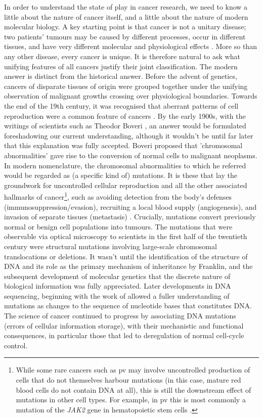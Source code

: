 \documentclass[../thesis.tex]{subfiles}
\begin{document}
In order to understand the state of play in cancer research, we need to know a little about the nature of cancer itself, and a little about the nature of modern molecular biology. A key starting point is that cancer is not a unitary disease;  two patients’ tumours may be caused by different processes, occur in different tissues, and have very different molecular and physiological effects \citep{wittekind_tnm_2016}. More so than any other disease, every cancer is unique. It is therefore natural to ask what unifying features of all cancers justify their joint classification. The modern answer is distinct from the historical answer. Before the advent of genetics, cancers of disparate tissues of origin were grouped together under the unifying observation of malignant growths crossing over physiological boundaries. Towards the end of the 19th century, it was recognised that aberrant patterns of cell reproduction were a common feature of cancers \citep{weinstein_history_2008}. By the early 1900s, with the writings of scientists such as Theodor Boveri \citep[see][for a modern translation]{boveri_concerning_2008}, an answer would be formulated foreshadowing our current understanding, although it wouldn't be until far later that this explanation was fully accepted. Boveri proposed that 'chromosomal abnormalities' gave rise to the conversion of normal cells to malignant neoplasms. In modern nomenclature, the chromosomal abnormalities to which he referred would be regarded as (a specific kind of) mutations. It is these that lay the groundwork for uncontrolled cellular reproduction and all the other associated hallmarks of cancer\footnote{While some rare cancers such as \acrfull{pv} may involve uncontrolled production of cells that do not themselves harbour mutations (in this case, mature red blood cells do not contain DNA at all), this is still the downstream effect of mutations in other cell types. For example, in \acrshort{pv} this is most commonly a mutation of the \textit{JAK2} gene in hematopoietic stem cells \citep{tefferi_jak2_2007}.}, such as avoiding detection from the body's defenses (immunosuppression/evasion), recruiting a local blood supply (angiogenesis), and invasion of separate tissues (metastasis) \citep{hanahan_hallmarks_2011}. Crucially, mutations convert previously normal or benign cell populations into tumours. The mutations that were observable via optical microscopy to scientists in the first half of the twentieth century were structural mutations involving large-scale chromosomal translocations or deletions. It wasn't until the identification of the structure of DNA and its role as the primary mechanism of inheritance by Franklin, \citet{watson_molecular_1953} and the subsequent development of molecular genetics that the discrete nature of biological information was fully appreciated. Later developments in DNA sequencing, beginning with the work of \citet{sanger_dna_1977} allowed a fuller understanding of mutations as changes to the sequence of nucleotide bases that constitutes DNA. The science of cancer continued to progress by associating DNA mutations (errors of cellular information storage), with their mechanistic and functional consequences, in particular those that led to deregulation of normal cell-cycle control.
\end{document}
